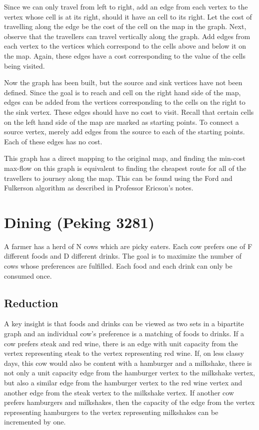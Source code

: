 \documentclass[12pt,letterpaper]{article}
\begin{document}
Since we can only travel from left to right, add an edge from each vertex to the vertex whose cell is at its right, should it have an cell to its right. Let the cost of travelling along the edge be the cost of the cell on the map in the graph. Next, observe that the travellers can travel vertically along the graph. Add edges from each vertex to the vertices which correspond to the cells above and below it on the map. Again, these edges have a cost corresponding to the value of the cells being visited.

Now the graph has been built, but the source and sink vertices have not been defined. Since the goal is to reach and cell on the right hand side of the map, edges can be added from the vertices corresponding to the cells on the right to the sink vertex. These edges should have no cost to visit. Recall that certain cells on the left hand side of the map are marked as starting points. To connect a source vertex, merely add edges from the source to each of the starting points. Each of these edges has no cost.

This graph has a direct mapping to the original map, and finding the min-cost max-flow on this graph is equivalent to finding the cheapest route for all of the travellers to journey along the map. This can be found using the Ford and Fulkerson algorithm as described in Professor Ericson's notes.

\section{Dining (Peking 3281)}
A farmer has a herd of N cows which are picky eaters. Each cow prefers one of F different foods and D different drinks. The goal is to maximize the number of cows whose preferences are fulfilled. Each food and each drink can only be consumed once.

\subsection{Reduction}
A key insight is that foods and drinks can be viewed as two sets in a bipartite graph and an individual cow's preference is a matching of foods to drinks. If a cow prefers steak and red wine, there is an edge with unit capacity from the vertex representing steak to the vertex representing red wine. If, on less classy days, this cow would also be content with a hamburger and a milkshake, there is not only a unit capacity edge from the hamburger vertex to the milkshake vertex, but also a similar edge from the hamburger vertex to the red wine vertex and another edge from the steak vertex to the milkshake vertex. If another cow prefers hamburgers and milkshakes, then the capacity of the edge from the vertex representing hamburgers to the vertex representing milkshakes can be incremented by one.
\end{document}
